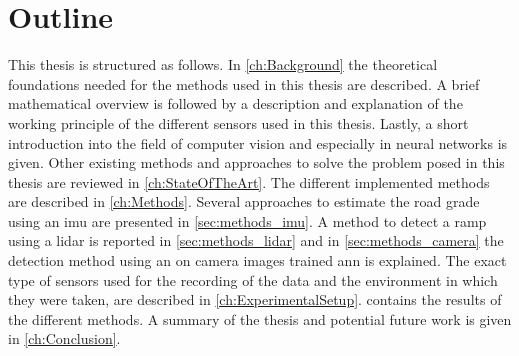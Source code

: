 \section{Outline}
This thesis is structured as follows.
In \cref{ch:Background} the theoretical foundations needed for the methods used in this thesis are described.
A brief mathematical overview is followed by a description and explanation of the working principle of the different sensors used in this thesis.
Lastly, a short introduction into the field of computer vision and especially in neural networks is given.
Other existing methods and approaches to solve the problem posed in this thesis are reviewed in \cref{ch:StateOfTheArt}.
The different implemented methods are described in \cref{ch:Methods}.
Several approaches to estimate the road grade using an \gls{imu} are presented in \cref{sec:methods_imu}.
A method to detect a ramp using a \gls{lidar} is reported in \cref{sec:methods_lidar} and in \cref{sec:methods_camera} the detection method using an on camera images trained \gls{ann} is explained.
The exact type of sensors used for the recording of the data and the environment in which they were taken, are described in \cref{ch:ExperimentalSetup}.
 contains the results of the different methods.
A summary of the thesis and potential future work is given in \cref{ch:Conclusion}.
